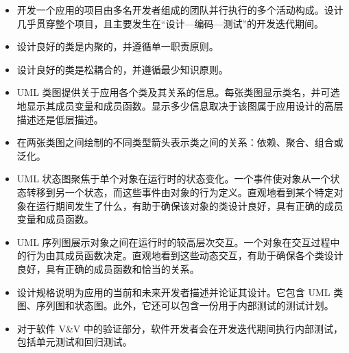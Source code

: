 \begin{itemize}
\item 开发一个应用的项目由多名开发者组成的团队并行执行的多个活动构成。设计几乎贯穿整个项目，且主要发生在“设计—编码—测试”的开发迭代期间。
\item 设计良好的类是内聚的，并遵循单一职责原则。
\item 设计良好的类是松耦合的，并遵循最少知识原则。
\item UML 类图提供关于应用各个类及其关系的信息。每张类图显示类名，并可选地显示其成员变量和成员函数。显示多少信息取决于该图属于应用设计的高层描述还是低层描述。
\item 在两张类图之间绘制的不同类型箭头表示类之间的关系：依赖、聚合、组合或泛化。
\item UML 状态图聚焦于单个对象在运行时的状态变化。一个事件使对象从一个状态转移到另一个状态，而这些事件由对象的行为定义。直观地看到某个特定对象在运行期间发生了什么，有助于确保该对象的类设计良好，具有正确的成员变量和成员函数。
\item UML 序列图展示对象之间在运行时的较高层次交互。一个对象在交互过程中的行为由其成员函数决定。直观地看到这些动态交互，有助于确保各个类设计良好，具有正确的成员函数和恰当的关系。
\item 设计规格说明为应用的当前和未来开发者描述并论证其设计。它包含 UML 类图、序列图和状态图。此外，它还可以包含一份用于内部测试的测试计划。
\item 对于软件 V\&V 中的验证部分，软件开发者会在开发迭代期间执行内部测试，包括单元测试和回归测试。
\end{itemize}
